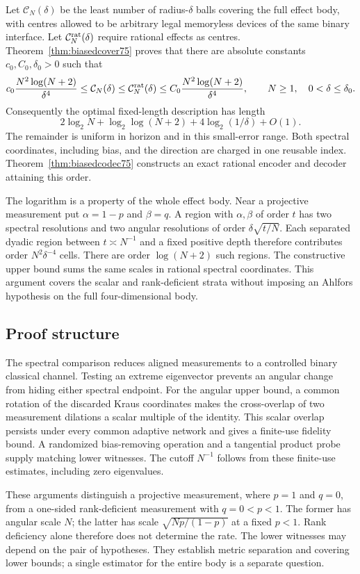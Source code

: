 Let $\mathcal C_N(\delta)$ be the least number of radius-$\delta$
balls covering the full effect body, with centres allowed to be
arbitrary legal memoryless devices of the same binary interface.
Let $\mathcal C_N^{\rm rat}(\delta)$ require rational effects as
centres. Theorem~\ref{thm:biasedcover75} proves that there are absolute
constants $c_0,C_0,\delta_0>0$ such that
\[
 c_0\frac{N^2\log(N+2)}{\delta^4}
 \le \mathcal C_N(\delta)
 \le \mathcal C_N^{\rm rat}(\delta)
 \le C_0\frac{N^2\log(N+2)}{\delta^4},
 \qquad N\ge1,\quad 0<\delta\le\delta_0.
\]
Consequently the optimal fixed-length description has length
\[
 2\log_2N+\log_2\log(N+2)+4\log_2(1/\delta)+O(1).
\]
The remainder is uniform in horizon and in this small-error range.
Both spectral coordinates, including bias, and the direction are
charged in one reusable index. Theorem~\ref{thm:biasedcodec75}
constructs an exact rational encoder and decoder attaining this order.

The logarithm is a property of the whole effect body. Near a projective
measurement put $\alpha=1-p$ and $\beta=q$. A region with
$\alpha,\beta$ of order $t$ has two spectral resolutions and two
angular resolutions of order $\delta\sqrt{t/N}$. Each separated
dyadic region between $t\asymp N^{-1}$ and a fixed positive depth
therefore contributes order $N^2\delta^{-4}$ cells. There are order
$\log(N+2)$ such regions. The constructive upper bound sums the same
scales in rational spectral coordinates. This argument covers the
scalar and rank-deficient strata without imposing an Ahlfors
hypothesis on the full four-dimensional body.

\subsection{Proof structure}
The spectral comparison reduces aligned measurements to a controlled
binary classical channel. Testing an extreme eigenvector prevents an
angular change from hiding either spectral endpoint. For the angular
upper bound, a common rotation of the discarded Kraus coordinates
makes the cross-overlap of two measurement dilations a scalar multiple
of the identity. This scalar overlap persists under every common
adaptive network and gives a finite-use fidelity bound. A randomized
bias-removing operation and a tangential product probe supply matching
lower witnesses. The cutoff $N^{-1}$ follows from these finite-use
estimates, including zero eigenvalues.

These arguments distinguish a projective measurement, where $p=1$ and
$q=0$, from a one-sided rank-deficient measurement with $q=0<p<1$.
The former has angular scale $N$; the latter has scale
$\sqrt{Np/(1-p)}$ at a fixed $p<1$. Rank deficiency alone therefore
does not determine the rate. The lower witnesses may depend on the
pair of hypotheses. They establish metric separation and covering
lower bounds; a single estimator for the entire body is a separate
question.

